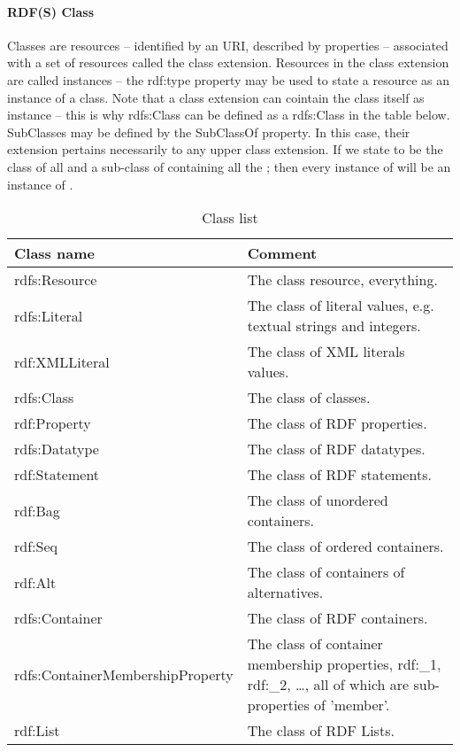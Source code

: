 \paragraph{RDF(S) Class}
Classes are resources – identified by an URI, described by properties – associated with a set of resources called the class extension. 
Resources in the class extension  are called instances – the rdf:type property may be used to state a resource as an instance of a class. 
Note that a class extension can cointain the class itself as instance – this is why rdfs:Class can be defined as a rdfs:Class in the table below.
SubClasses may be defined by the SubClassOf property. In this case, their extension pertains necessarily to any upper class extension. 
If we state  to be the class of all  and  a sub-class of  containing all the  ; then every instance of  will be an instance of . 

\begin{table}[ht!]
   \begin{center}
		\begin{tabularx}{400pt}{|l|X|}
		   \hline
		Class name & Comment\\ \hline\hline
		rdfs:Resource & The class resource, everything.\\ \hline
		rdfs:Literal & The class of literal values, e.g. textual strings and integers.\\ \hline
		rdf:XMLLiteral & The class of XML literals values.\\ \hline
		rdfs:Class & The class of classes.\\ \hline
		rdf:Property & The class of RDF properties.\\ \hline
		rdfs:Datatype & The class of RDF datatypes.\\ \hline
		rdf:Statement & The class of RDF statements.\\ \hline
		rdf:Bag & The class of unordered containers.\\ \hline
		rdf:Seq & The class of ordered containers.\\ \hline
		rdf:Alt & The class of containers of alternatives.\\ \hline
		rdfs:Container & The class of RDF containers.\\ \hline
		rdfs:ContainerMembershipProperty & The class of container membership properties, rdf:\_1, rdf:\_2, \dots, all of which are sub-properties of 'member'.\\ \hline
		rdf:List & The class of RDF Lists.\\ \hline
		\end{tabularx}
		\caption{Class list \label{tab:rdfs-classes}}
   \end{center}
\end{table}

